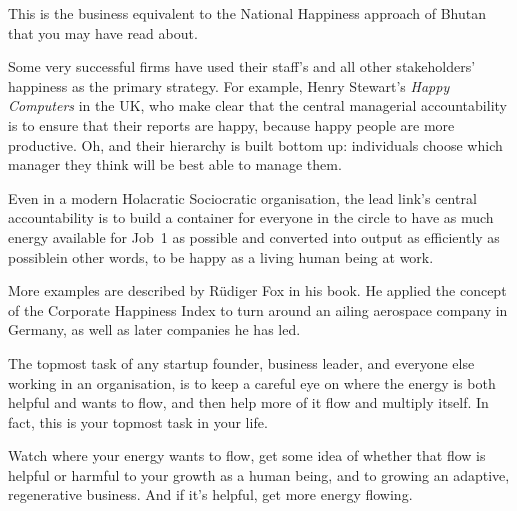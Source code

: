 This is the business equivalent to the National Happiness approach of Bhutan that you may have read about. 


Some very successful firms have used their staff’s and all other stakeholders’ happiness as the primary strategy. For example, Henry Stewart's \emph{Happy Computers} in the UK\cite{stewart-happy-manifesto}, who make clear that the central managerial accountability is to ensure that their reports are happy, because happy people are more productive. Oh, and their hierarchy is built bottom up: individuals choose which manager they think will be best able to manage them. 


Even in a modern Holacratic Sociocratic organisation, the lead link’s central accountability is to build a container for everyone in the circle to have as much energy available for Job~1 as possible and converted into output as efficiently as possible\textemdash in other words, to be happy as a living human being at work. 


More examples are described by R{\"u}diger Fox in his book\cite{fox-corporate-happiness}. He applied the concept of the Corporate Happiness Index to turn around an ailing aerospace company in Germany, as well as later companies he has led. 


The topmost task of any startup founder, business leader, and everyone else working in an organisation, is to keep a careful eye on where the energy is both helpful and wants to flow, and then help more of it flow and multiply itself. In fact, this is your topmost task in your life. 


Watch where your energy wants to flow, get some idea of whether that flow is helpful or harmful to your growth as a human being, and to growing an adaptive, regenerative business. And if it's helpful, get more energy flowing.


